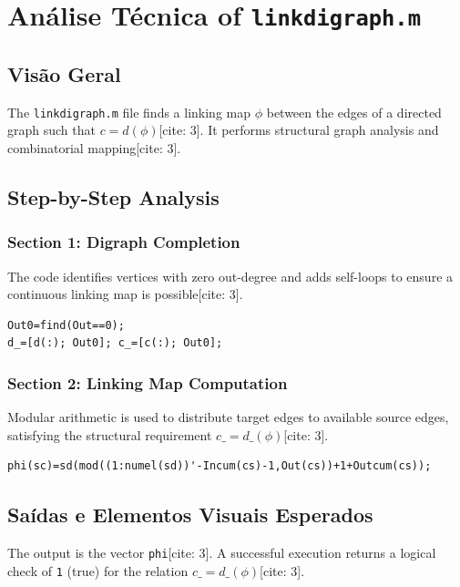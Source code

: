
\chapter{Análise Técnica of \texttt{linkdigraph.m}}
\date{March 10, 2026}

\section{Visão Geral}
The \texttt{linkdigraph.m} file finds a linking map $\phi$ between the edges of a directed graph such that $c = d(\phi)$[cite: 3]. It performs structural graph analysis and combinatorial mapping[cite: 3].

\section{Step-by-Step Analysis}

\subsection{Section 1: Digraph Completion}
The code identifies vertices with zero out-degree and adds self-loops to ensure a continuous linking map is possible[cite: 3].
\begin{lstlisting}
Out0=find(Out==0);
d_=[d(:); Out0]; c_=[c(:); Out0];
\end{lstlisting}

\subsection{Section 2: Linking Map Computation}
Modular arithmetic is used to distribute target edges to available source edges, satisfying the structural requirement $c\_ = d\_(\phi)$[cite: 3].
\begin{lstlisting}
phi(sc)=sd(mod((1:numel(sd))'-Incum(cs)-1,Out(cs))+1+Outcum(cs));
\end{lstlisting}

\section{Saídas e Elementos Visuais Esperados}
The output is the vector \texttt{phi}[cite: 3]. A successful execution returns a logical check of \texttt{1} (true) for the relation $c\_ = d\_(\phi)$[cite: 3].
